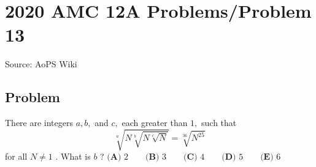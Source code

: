 \documentclass[12pt]{article}
\begin{document}
\section*{{2020 AMC 12A Problems/Problem 13}}
Source: AoPS Wiki

\subsection*{Problem}
There are integers $a, b,$ and $c,$ each greater than $1,$ such that \[\sqrt[a]{N\sqrt[b]{N\sqrt[c]{N}}} = \sqrt[36]{N^{25}}\] for all $N \neq 1$ . What is $b$ ? $\textbf{(A) } 2 \qquad \textbf{(B) } 3 \qquad \textbf{(C) } 4 \qquad \textbf{(D) } 5 \qquad \textbf{(E) } 6$
\end{document}
